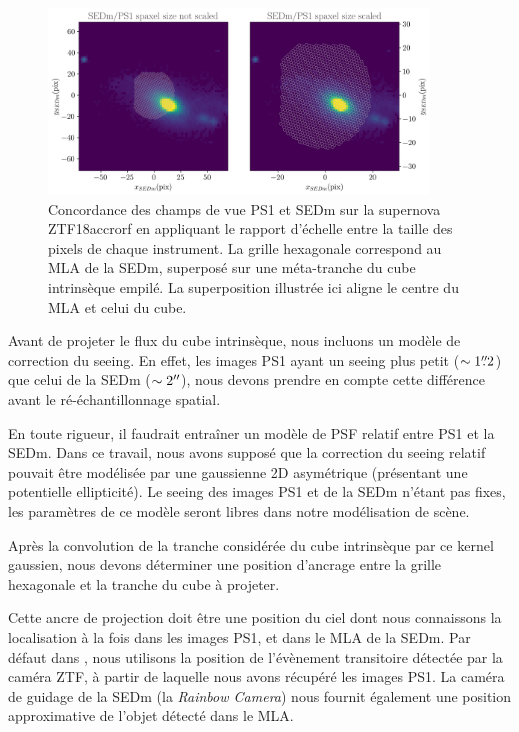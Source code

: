 \documentclass[../main/main.tex]{subfiles}
\begin{document}
\begin{figure}[ht]
  \centering
  \includegraphics[width=0.9\textwidth]{../figures/07_scene/scaleadapted.png}
  \caption[Concordance des champs de vue PS1 et SEDm.]{Concordance des
    champs de vue PS1 et SEDm sur la supernova ZTF18accrorf en appliquant le rapport d'échelle entre
    la taille des pixels de chaque instrument. La grille hexagonale
    correspond au MLA de la SEDm, superposé sur une méta-tranche du cube
    intrinsèque empilé. La superposition illustrée ici aligne le centre
    du MLA et celui du cube.}
  \label{fig:scaleadapted}
\end{figure}

Avant de projeter le flux du cube intrinsèque, nous incluons un modèle de
correction du seeing. En effet, les images PS1 ayant un seeing plus
petit ($\sim1\overset{\prime\prime}{.}2$) que celui de la SEDm ($\sim2^{\prime\prime}$), nous
devons prendre en compte cette différence avant le ré-échantillonnage
spatial.

En toute rigueur, il faudrait entraîner un modèle de PSF relatif entre
PS1 et la SEDm. Dans ce travail, nous avons supposé que la correction du
seeing relatif pouvait être modélisée par une gaussienne 2D asymétrique
(présentant une potentielle ellipticité). Le seeing des images PS1 et
de la SEDm n'étant pas fixes, les paramètres de ce modèle seront libres
dans notre modélisation de scène.

Après la convolution de la tranche considérée du cube intrinsèque par ce
kernel gaussien, nous devons déterminer une position d'ancrage entre la
grille hexagonale et la tranche du cube à projeter.

Cette ancre de projection doit être une position du ciel dont nous
connaissons la localisation à la fois dans les images PS1, et dans le
MLA de la SEDm. Par défaut dans \hypergal, nous utilisons la position
de l'évènement transitoire détectée par la caméra ZTF, à partir de
laquelle nous avons récupéré les images PS1. La caméra de guidage de la
SEDm (la \textit{Rainbow Camera}) nous fournit également une position
approximative de l'objet détecté dans le MLA.
\end{document}
